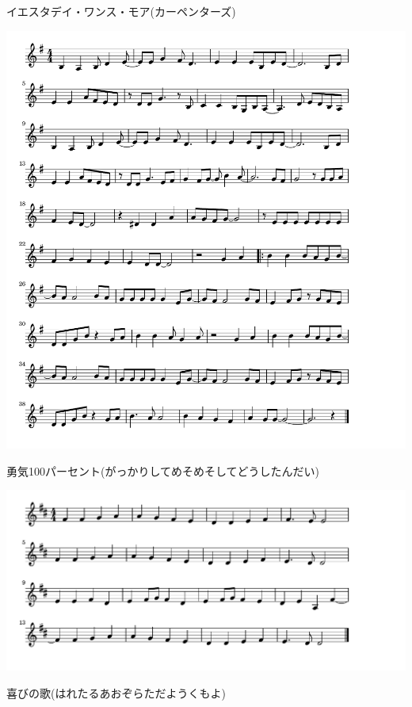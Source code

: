 \documentclass[a4paper]{ltjsarticle}
\begin{document}
\vspace{-10mm} \hspace{10mm}
イエスタデイ・ワンス・モア(カーペンターズ)

\includegraphics[clip]{yuki100p_crop.pdf}

\vspace{-10mm} \hspace{10mm}
勇気100パーセント(がっかりしてめそめそしてどうしたんだい)

\includegraphics[clip]{yorokobi_crop.pdf}

\vspace{-10mm} \hspace{10mm}
喜びの歌(はれたるあおぞらただようくもよ)
\end{document}
